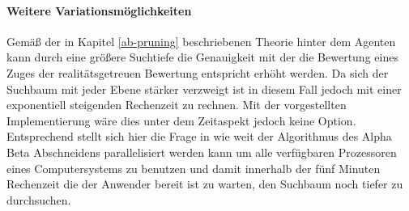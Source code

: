 \paragraph{Weitere Variationsmöglichkeiten}
Gemäß der in Kapitel \ref{ab-pruning} beschriebenen Theorie hinter dem Agenten  kann durch eine größere Suchtiefe  die Genauigkeit mit der die Bewertung eines Zuges der realitätsgetreuen Bewertung entspricht erhöht werden. Da sich der Suchbaum mit jeder Ebene stärker verzweigt ist in diesem Fall jedoch mit einer exponentiell steigenden Rechenzeit zu rechnen. Mit der vorgestellten Implementierung wäre dies unter dem Zeitaspekt jedoch keine Option. Entsprechend stellt sich hier die Frage in wie weit der Algorithmus des Alpha Beta Abschneidens parallelisiert werden kann um alle verfügbaren Prozessoren eines Computersystems zu benutzen und damit innerhalb der fünf Minuten Rechenzeit die der Anwender bereit ist zu warten, den Suchbaum noch tiefer zu durchsuchen.


